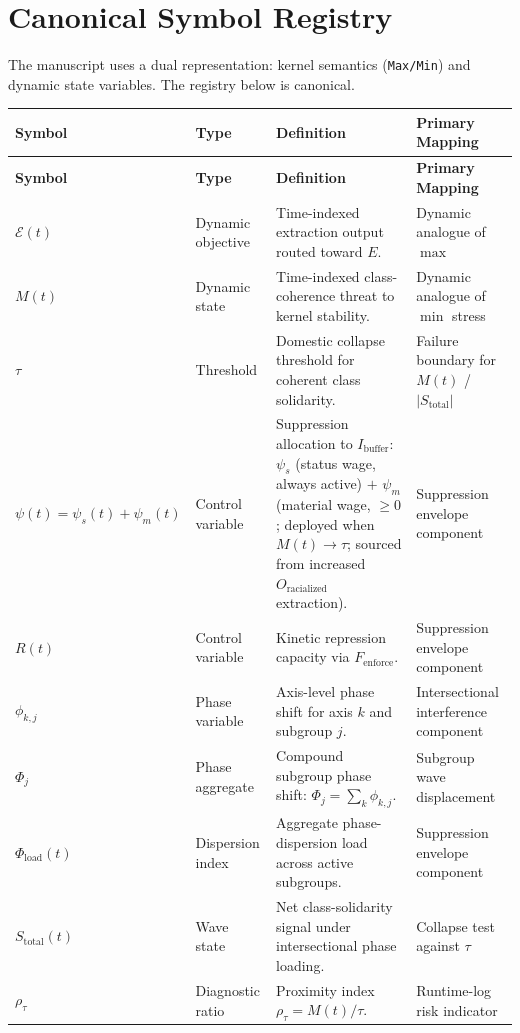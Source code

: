 \section{Canonical Symbol Registry}

The manuscript uses a dual representation: kernel semantics (\texttt{Max/Min}) and dynamic state variables. The registry below is canonical.

\begin{longtable}{>{\raggedright}p{2.7cm} >{\raggedright}p{3.2cm} >{\raggedright}p{5.3cm} >{\raggedright\arraybackslash}p{3.3cm}}
\toprule
\textbf{Symbol} & \textbf{Type} & \textbf{Definition} & \textbf{Primary Mapping} \\
\midrule
\endfirsthead
\toprule
\textbf{Symbol} & \textbf{Type} & \textbf{Definition} & \textbf{Primary Mapping} \\
\midrule
\endhead
$\mathcal{E}(t)$ & Dynamic objective & Time-indexed extraction output routed toward $E$. & Dynamic analogue of $\max$ \\
$M(t)$ & Dynamic state & Time-indexed class-coherence threat to kernel stability. & Dynamic analogue of $\min$ stress \\
$\tau$ & Threshold & Domestic collapse threshold for coherent class solidarity. & Failure boundary for $M(t)$ / $|S_{\text{total}}|$ \\
$\psi(t) = \psi_s(t)+\psi_m(t)$ & Control variable & Suppression allocation to $I_{\text{buffer}}$: $\psi_s$ (status wage, always active) $+$ $\psi_m$ (material wage, $\geq 0$; deployed when $M(t)\to\tau$; sourced from increased $O_{\text{racialized}}$ extraction). & Suppression envelope component \\
$R(t)$ & Control variable & Kinetic repression capacity via $F_{\text{enforce}}$. & Suppression envelope component \\
$\phi_{k,j}$ & Phase variable & Axis-level phase shift for axis $k$ and subgroup $j$. & Intersectional interference component \\
$\Phi_j$ & Phase aggregate & Compound subgroup phase shift: $\Phi_j=\sum_k \phi_{k,j}$. & Subgroup wave displacement \\
$\Phi_{\text{load}}(t)$ & Dispersion index & Aggregate phase-dispersion load across active subgroups. & Suppression envelope component \\
$S_{\text{total}}(t)$ & Wave state & Net class-solidarity signal under intersectional phase loading. & Collapse test against $\tau$ \\
$\rho_{\tau}$ & Diagnostic ratio & Proximity index $\rho_{\tau}=M(t)/\tau$. & Runtime-log risk indicator \\

\end{longtable}
